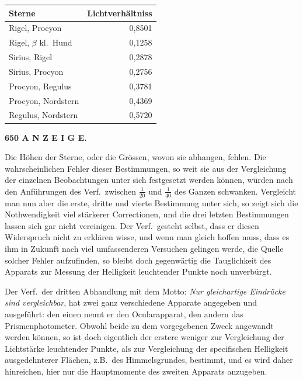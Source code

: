 \documentclass[12pt,a4paper]{article}
\begin{document}
\begin{center}
\small
\begin{tabular}{l@{\quad}r}
\toprule
\textbf{Sterne} & \textbf{Lichtverh\"altniss} \\
\midrule
Rigel, Procyon & 0,8501 \\
Rigel, $\beta$ kl.\ Hund & 0,1258 \\
Sirius, Rigel & 0,2878 \\
Sirius, Procyon & 0,2756 \\
Procyon, Regulus & 0,3781 \\
Procyon, Nordstern & 0,4369 \\
Regulus, Nordstern & 0,5720 \\
\bottomrule
\end{tabular}
\end{center}

\begin{center}\small\textbf{650 A N Z E I G E.}\end{center}

Die H\"ohen der Sterne, oder die Gr\"ossen, wovon sie abhangen, fehlen. Die wahrscheinlichen Fehler dieser Bestimmungen, so weit sie aus der Vergleichung der einzelnen Beobachtungen unter sich festgesetzt werden k\"onnen, w\"urden nach den Anf\"uhrungen des Verf.\ zwischen $\frac{1}{20}$ und $\frac{1}{40}$ des Ganzen schwanken. Vergleicht man nun aber die erste, dritte und vierte Bestimmung unter sich, so zeigt sich die Nothwendigkeit viel st\"arkerer Correctionen, und die drei letzten Bestimmungen lassen sich gar nicht vereinigen. Der Verf.\ gesteht selbst, dass er diesen Widerspruch nicht zu erkl\"aren wisse, und wenn man gleich hoffen muss, dass es ihm in Zukunft nach viel umfassenderen Versuchen gelingen werde, die Quelle solcher Fehler aufzufinden, so bleibt doch gegenw\"artig die Tauglichkeit des Apparats zur Messung der Helligkeit leuchtender Punkte noch unverb\"urgt.

Der Verf.\ der dritten Abhandlung mit dem Motto: \textit{Nur gleichartige Eindr\"ucke sind vergleichbar}, hat zwei ganz verschiedene Apparate angegeben und ausgef\"uhrt: den einen nennt er den Ocularapparat, den andern das Prismenphotometer. Obwohl beide zu dem vorgegebenen Zweck angewandt werden k\"onnen, so ist doch eigentlich der erstere weniger zur Vergleichung der Lichtst\"arke leuchtender Punkte, als zur Vergleichung der specifischen Helligkeit ausgedehnterer Fl\"achen, z.B.\ des Himmelsgrundes, bestimmt, und es wird daher hinreichen, hier nur die Hauptmomente des zweiten Apparats anzugeben.
\end{document}

